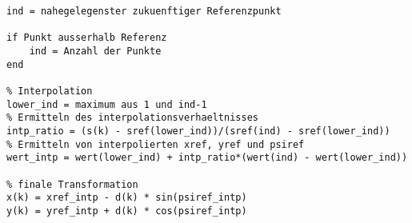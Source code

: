 \begin{lstlisting}
ind = nahegelegenster zukuenftiger Referenzpunkt
	
if Punkt ausserhalb Referenz
	ind = Anzahl der Punkte
end

% Interpolation 
lower_ind = maximum aus 1 und ind-1
% Ermitteln des interpolationsverhaeltnisses
intp_ratio = (s(k) - sref(lower_ind))/(sref(ind) - sref(lower_ind))
% Ermitteln von interpolierten xref, yref und psiref
wert_intp = wert(lower_ind) + intp_ratio*(wert(ind) - wert(lower_ind))

% finale Transformation
x(k) = xref_intp - d(k) * sin(psiref_intp)
y(k) = yref_intp + d(k) * cos(psiref_intp)
\end{lstlisting}
                                                                     


